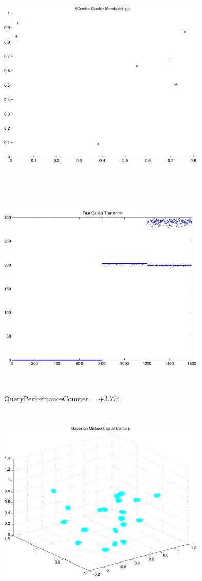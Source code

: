 \documentclass[9pt]{article}
\theoremstyle{plain}
\theoremstyle{definition}
\theoremstyle{remark}
\numberwithin{equation}{section}
\begin{document}
\includegraphics[width=10.0cm,height=10.0cm]{KCenterClusterMemberships_4_Centers.pdf}

\includegraphics[width=10.0cm,height=10.0cm]{FGT4_Centers.pdf}

QueryPerformanceCounter  =  +3.774
\includegraphics[width=10.0cm,height=10.0cm]{GaussianMixture_ClusterCenters20_Centers.pdf}
\end{document}
